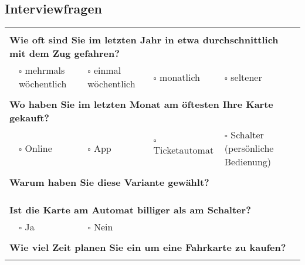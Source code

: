 \documentclass[]{article}
\begin{document}
\newpage
{}
\begin{landscape}

\section{Interviewfragen}
\label{sec:interviewfragen}

\begin{table}[h!]
	\large
	\begin{tabular}{|llllll|}
		\hline
		& & & & & \\
		\multicolumn{6}{|l|}{\textbf{Wie oft sind Sie im letzten Jahr in etwa durchschnittlich mit dem Zug gefahren?}}                      \\ \hline
		& $\square$ mehrmals wöchentlich & $\square$ einmal wöchentlich & $\square$ monatlich & $\square$ seltener &                        \\ \hline
		& & & & & \\
		\multicolumn{6}{|l|}{\textbf{Wo haben Sie im letzten Monat am öftesten Ihre Karte gekauft?}}                                        \\ \hline
		& $\square$ Online & $\square$ App & $\square$ Ticketautomat & \multicolumn{2}{l|}{$\square$ Schalter (persönliche Bedienung)}      \\ \hline
		& & & & & \\
		\multicolumn{6}{|l|}{\textbf{Warum haben Sie diese Variante gewählt?}}                                                              \\ \hline
		\multicolumn{6}{|l|}{}                                                                                                              \\
		& & & & & \\ \hline
		& & & & & \\
		\multicolumn{6}{|l|}{\textbf{Ist die Karte am Automat billiger als am Schalter?}}                                                   \\ \hline
		& $\square$ Ja & $\square$ Nein &  &  &                                                                                             \\ \hline
		& & & & & \\
		\multicolumn{6}{|l|}{\textbf{Wie viel Zeit planen Sie ein um eine Fahrkarte zu kaufen?}}                                            \\ \hline
		\multicolumn{6}{|l|}{}                                                                                                              \\

\end{tabular}
\end{table}
\end{landscape}
\end{document}
